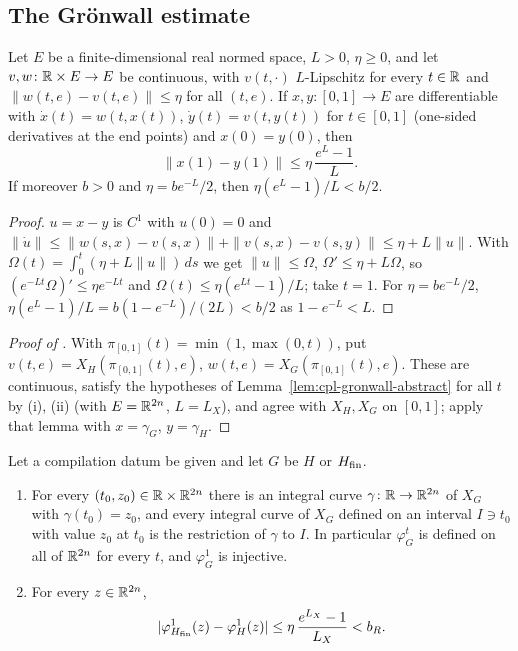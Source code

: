 \subsection{The Gr\"onwall estimate}\label{sec:cpl-gronwall}

\begin{lemma}[Gr\"onwall]\label{lem:cpl-gronwall-abstract}
Let $E$ be a finite-dimensional real normed space, $L>0$, $\eta\ge0$, and let $v,w\colon\mathbb{R}\times E\to E$ be
continuous, with $v(t,\cdot)$ $L$-Lipschitz for every $t\in\mathbb{R}$ and $\|w(t,e)-v(t,e)\|\le\eta$ for all $(t,e)$. If
$x,y\colon[0,1]\to E$ are differentiable with $\dot x(t)=w(t,x(t))$, $\dot y(t)=v(t,y(t))$ for $t\in[0,1]$
(one-sided derivatives at the end points) and $x(0)=y(0)$, then
\[
 \|x(1)-y(1)\|\le\eta\,\frac{e^L-1}L .
\]
If moreover $b>0$ and $\eta=be^{-L}/2$, then $\eta(e^L-1)/L<b/2$.
\end{lemma}

\begin{proof}
$u=x-y$ is $C^1$ with $u(0)=0$ and $\|\dot u\|\le\|w(s,x)-v(s,x)\|+\|v(s,x)-v(s,y)\|\le\eta+L\|u\|$. With
$\Omega(t)=\int_0^t(\eta+L\|u\|)\,ds$ we get $\|u\|\le\Omega$, $\Omega'\le\eta+L\Omega$, so
$(e^{-Lt}\Omega)'\le\eta e^{-Lt}$ and $\Omega(t)\le\eta(e^{Lt}-1)/L$; take $t=1$. For $\eta=be^{-L}/2$,
$\eta(e^L-1)/L=b(1-e^{-L})/(2L)<b/2$ as $1-e^{-L}<L$.
\end{proof}

\begin{proof}[Proof of ]
With $\pi_{[0,1]}(t)=\min(1,\max(0,t))$, put $v(t,e)=X_H(\pi_{[0,1]}(t),e)$, $w(t,e)=X_G(\pi_{[0,1]}(t),e)$. These are
continuous, satisfy the hypotheses of Lemma~\ref{lem:cpl-gronwall-abstract} for all $t$ by (i), (ii) (with
$E=\mathbb{R}^{2n}$, $L=L_X$), and agree with $X_H,X_G$ on $[0,1]$; apply that lemma with $x=\gamma_G$, $y=\gamma_H$.
\end{proof}

\begin{lemma}\label{lem:cpl-gronwall}
Let a compilation datum be given and let $G$ be $H$ or $H_{\mathrm{fin}}$.
\begin{enumerate}[label=(\alph*)]
\item For every $(t_0,z_0)\in\mathbb{R}\times\mathbb{R}^{2n}$ there is an integral curve $\gamma\colon\mathbb{R}\to\mathbb{R}^{2n}$ of $X_G$ with
 $\gamma(t_0)=z_0$, and every integral curve of $X_G$ defined on an interval $I\ni t_0$ with value $z_0$ at $t_0$
 is the restriction of $\gamma$ to $I$. In particular $\varphi^t_G$ is defined on all of $\mathbb{R}^{2n}$ for every $t$, and
 $\varphi^1_G$ is injective.
\item For every $z\in\mathbb{R}^{2n}$,
\[
 |\varphi^1_{H_{\mathrm{fin}}}(z)-\varphi^1_H(z)|\le\eta\,\frac{e^{L_X}-1}{L_X}<b_R .
\]
\end{enumerate}
\end{lemma}

